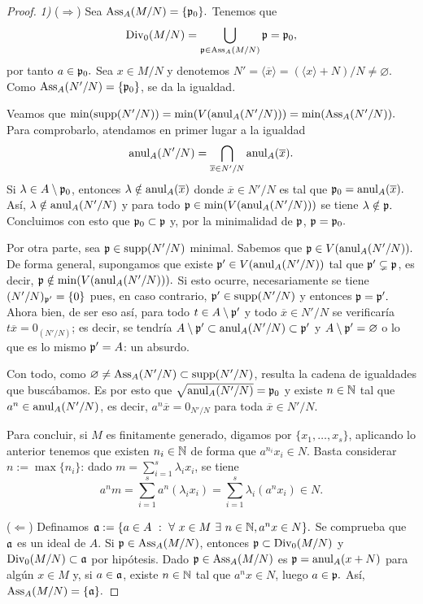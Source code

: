 \documentclass[../main.tex]{subfiles}
\begin{document}
\begin{proof} \textit{1)} ($\Rightarrow$)
Sea $\text{Ass}_A(M/N)=\{\mathfrak{p}_0\}.$ Tenemos que
$$\operatorname{Div}_0(M/N)=\bigcup_{\mathfrak{p}\in\text{Ass}_A(M/N)}\mathfrak{p}=\mathfrak{p}_0,$$
por tanto $a\in\mathfrak{p}_0.$ Sea $x\in M/N$ y denotemos $N'=\langle\overline{x}\rangle=(\langle x\rangle +N)/N\neq\varnothing.$ Como $\text{Ass}_A(N'/N)=\{\mathfrak{p}_0\}$, se da la igualdad.

Veamos que $\min(\operatorname{supp}(N'/N))=\min(V(\operatorname{anul}_A(N'/N)))=\min(\text{Ass}_A(N'/N)).$ Para comprobarlo, atendamos en primer lugar a la igualdad
$$\operatorname{anul}_A(N'/N)=\bigcap_{\overline{x}\in N'/N}\operatorname{anul}_A(\overline{x}).$$
Si $\lambda\in A\setminus\mathfrak{p}_0$, entonces $\lambda\notin\operatorname{anul}_A(\overline{x})$ donde $\overline{x}\in N'/N$ es tal que $\mathfrak{p}_0=\operatorname{anul}_A(\overline{x}).$ Así, $\lambda\notin\operatorname{anul}_A(N'/N)$ y para todo $\mathfrak{p}\in \min(V(\operatorname{anul}_A(N'/N)))$ se tiene $\lambda\notin\mathfrak{p}.$ Concluimos con esto que $\mathfrak{p}_0\subset\mathfrak{p}$ y, por la minimalidad de $\mathfrak{p}$, $\mathfrak{p}=\mathfrak{p}_0.$

Por otra parte, sea $\mathfrak{p}\in\operatorname{supp} (N'/N)$ minimal. Sabemos que $\mathfrak{p}\in V(\operatorname{anul}_A (N'/N)).$ De forma general, supongamos que existe $\mathfrak{p}'\in V(\operatorname{anul}_A(N'/N))$ tal que $\mathfrak{p}'\subsetneq\mathfrak{p}$, es decir, $\mathfrak{p}\notin\min(V(\operatorname{anul}_A(N'/N))).$ Si esto ocurre, necesariamente se tiene $(N'/N)_{\mathfrak{p}'}=\{0\}$ pues, en caso contrario, $\mathfrak{p}'\in\operatorname{supp} (N'/N)$ y entonces $\mathfrak{p}=\mathfrak{p}'.$ Ahora bien, de ser eso así, para todo $t\in A\setminus\mathfrak{p}'$ y todo $\overline{x}\in N'/N$ se verificaría $t\overline{x}=0_{(N'/N)}$; es decir, se tendría $A\setminus\mathfrak{p}'\subset\operatorname{anul}_A(N'/N)\subset\mathfrak{p}'$ y $A\setminus\mathfrak{p}'=\varnothing$ o lo que es lo mismo $\mathfrak{p}'=A$: un absurdo.

Con todo, como $\varnothing\neq\text{Ass}_A(N'/N)\subset\operatorname{supp}(N'/N)$, resulta la cadena de igualdades que buscábamos. Es por esto que $\sqrt{\operatorname{anul}_A (N'/N)}=\mathfrak{p}_0$ y existe $n\in\mathbb{N}$ tal que $a^n\in\operatorname{anul}_A(N'/N)$, es decir, $a^n\overline{x}=0_{N'/N}$ para toda $\overline{x}\in N'/N.$

Para concluir, si $M$ es finitamente generado, digamos por $\{x_1,\dots,x_s\}$, aplicando lo anterior tenemos que existen $n_i\in\mathbb{N}$ de forma que $a^{n_i}x_i\in N.$ Basta considerar $n:=\max\{n_i\}$: dado $m=\sum_{i=1}^s\lambda_ix_i$, se tiene
$$a^nm=\sum_{i=1}^sa^n(\lambda_i x_i)=\sum_{i=1}^s\lambda_i(a^n x_i)\in N.$$

($\Leftarrow$) Definamos $\af:=\{a\in A\ :\ \forall\ x\in M\ \exists\ n\in\N, a^nx\in N\}.$ Se comprueba que $\mathfrak{a}$ es un ideal de $A.$ Si $\mathfrak{p}\in\text{Ass}_A(M/N)$, entonces $\mathfrak{p}\subset\operatorname{Div}_0(M/N)$ y $\operatorname{Div}_0(M/N)\subset\mathfrak{a}$ por hipótesis. Dado $\mathfrak{p}\in\text{Ass}_A(M/N)$ es $\mathfrak{p}=\operatorname{anul}_A(x+N)$ para algún $x\in M$ y, si $a\in\mathfrak{a}$, existe $n\in\mathbb{N}$ tal que $a^nx\in N$, luego $a\in\mathfrak{p}.$ Así, $\text{Ass}_A(M/N)=\{\mathfrak{a}\}.$


\end{proof}
\end{document}
